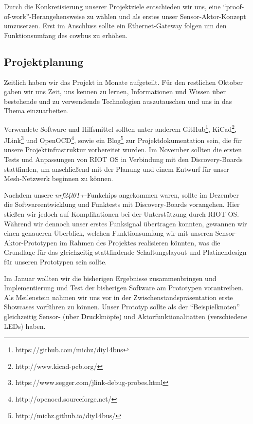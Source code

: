 \documentclass{IEEEtran}
\begin{document}
    Durch die Konkretisierung unserer Projektziele entschieden wir uns, eine 
    \enquote{proof-of-work}-Herangehensweise zu wählen und als erstes unser 
    Sensor-Aktor-Konzept umzusetzen. Erst im Anschluss sollte ein 
    Ethernet-Gateway folgen um den Funktionsumfang des cowbus zu erhöhen.

    \subsection{Projektplanung}
    Zeitlich haben wir das Projekt in Monate aufgeteilt. Für den restlichen Oktober 
    gaben wir uns Zeit, uns kennen zu lernen, Informationen und Wissen über bestehende 
    und zu verwendende Technologien auszutauschen und uns in das Thema einzuarbeiten.
    
    Verwendete Software und Hilfsmittel sollten unter anderem
    GitHub\footnote{https://github.com/michz/diy14bus},
    KiCad\footnote{http://www.kicad-pcb.org/},
    JLink\footnote{https://www.segger.com/jlink-debug-probes.html}
    und OpenOCD\footnote{http://openocd.sourceforge.net/}, sowie ein
    Blog\footnote{http://michz.github.io/diy14bus/}
    zur Projektdokumentation sein, die für unsere 
    Projektinfrastruktur vorbereitet wurden.
    Im November sollten die ersten Tests und Anpassungen von RIOT OS in Verbindung 
    mit den Discovery-Boards stattfinden, um anschließend mit der Planung und einem 
    Entwurf für unser Mesh-Netzwerk beginnen zu können.
   
    Nachdem unsere \emph{nrf24l01+}-Funkchips angekommen waren, sollte im Dezember 
    die Softwareentwicklung und  Funktests mit Discovery-Boards vorangehen.
    Hier stießen wir jedoch auf Komplikationen bei der Unterstützung durch RIOT OS. 
    Während wir dennoch unser erstes Funksignal übertragen konnten, gewannen wir 
    einen genaueren Überblick, welchen Funktionsumfang wir mit unseren 
    Sensor-Aktor-Prototypen im Rahmen des Projektes realisieren könnten, was die 
    Grundlage für das gleichzeitig stattfindende Schaltungslayout und 
    Platinendesign für unseren Prototypen sein sollte.
    
    Im Januar wollten wir die bisherigen Ergebnisse zusammenbringen und  
    Implementierung und Test der bisherigen Software am Prototypen vorantreiben. 
    Als Meilenstein nahmen wir uns vor in der Zwischenstandspräsentation erste 
    Showcases vorführen zu können. Unser Prototyp sollte als der 
    \enquote{Beispielknoten} gleichzeitig Sensor- (über Druckknöpfe) und 
    Aktorfunktionalitätten (verschiedene LEDs) haben.
    
\end{document}
